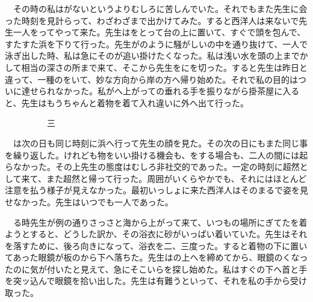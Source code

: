 \documentclass[a4j,onecolumn]{tarticle}
\begin{document}
　その時の私はがないというよりむしろに苦しんでいた。\hbox{}それでもまた先生に会った時刻を見計らって、\hbox{}わざわざまで出かけてみた。\hbox{}すると西洋人は来ないで先生一人をってやって来た。\hbox{}先生はをとって台の上に置いて、\hbox{}すぐで頭を包んで、\hbox{}すたすた浜を下りて行った。\hbox{}先生がのように騒がしいの中を通り抜けて、\hbox{}一人で泳ぎ出した時、\hbox{}私は急にそのが追い掛けたくなった。\hbox{}私は浅い水を頭の上までかして相当の深さの所まで来て、\hbox{}そこから先生をにを切った。\hbox{}すると先生は昨日と違って、\hbox{}一種のをいて、\hbox{}妙な方向から岸の方へ帰り始めた。\hbox{}それで私の目的はついに達せられなかった。\hbox{}私がへ上がっての垂れる手を振りながら掛茶屋に入ると、\hbox{}先生はもうちゃんと着物を着て入れ違いに外へ出て行った。\hbox{}\par{}\par{}　　　　　三
\par{}
　は次の日も同じ時刻に浜へ行って先生の顔を見た。\hbox{}その次の日にもまた同じ事を繰り返した。\hbox{}けれども物をいい掛ける機会も、\hbox{}をする場合も、\hbox{}二人の間には起らなかった。\hbox{}その上先生の態度はむしろ非社交的であった。\hbox{}一定の時刻に超然として来て、\hbox{}また超然と帰って行った。\hbox{}周囲がいくらやかでも、\hbox{}それにはほとんど注意を払う様子が見えなかった。\hbox{}最初いっしょに来た西洋人はそのまるで姿を見せなかった。\hbox{}先生はいつでも一人であった。\hbox{}\par{}
　る時先生が例の通りさっさと海から上がって来て、\hbox{}いつもの場所にぎてたを着ようとすると、\hbox{}どうした訳か、\hbox{}その浴衣に砂がいっぱい着いていた。\hbox{}先生はそれを落すために、\hbox{}後ろ向きになって、\hbox{}浴衣を二、\hbox{}三度った。\hbox{}すると着物の下に置いてあった眼鏡が板のから下へ落ちた。\hbox{}先生はの上へを締めてから、\hbox{}眼鏡のくなったのに気が付いたと見えて、\hbox{}急にそこいらを探し始めた。\hbox{}私はすぐの下へ首と手を突ッ込んで眼鏡を拾い出した。\hbox{}先生は有難うといって、\hbox{}それを私の手から受け取った。\hbox{}\par{}
\end{document}
